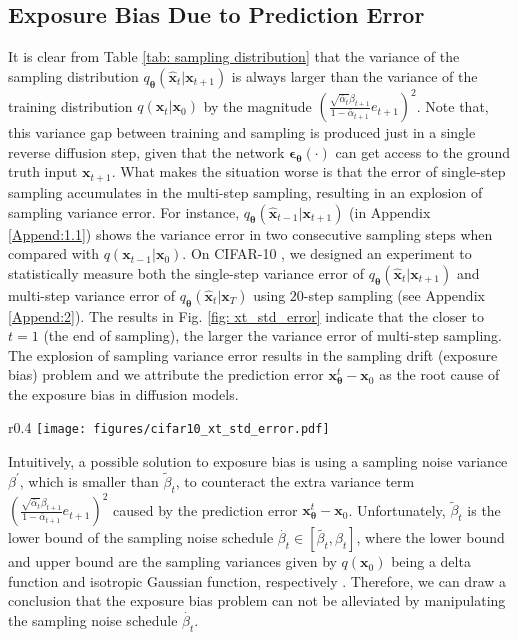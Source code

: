 \documentclass{article} \usepackage{iclr2024_conference,times}
\begin{document}
\subsection{Exposure Bias Due to Prediction Error}
\label{subsec: Exposure Bias Due to Prediction Error}

It is clear from Table \ref{tab: sampling distribution} that the variance of the sampling distribution $q_{\pmb{\theta}}(\hat{\pmb{x}}_{t} | \pmb{x}_{t+1})$ is always larger than the variance of the training distribution $q(\pmb{x}_{t} | \pmb{x}_0)$ by the magnitude $(\frac{\sqrt{\bar{\alpha}_t} \beta_{t+1}}{1-\bar{\alpha}_{t+1}} e_{t+1})^2$. Note that, this variance gap between training and sampling is produced just in a single reverse diffusion step, given that the network $\pmb{\epsilon_{\theta}}(\cdot)$ can get access to the ground truth input $\pmb{x}_{t+1}$. What makes the situation worse is that the error of single-step sampling accumulates in the multi-step sampling, resulting in an explosion of sampling variance error. For instance, $q_{\pmb{\theta}}(\hat{\pmb{x}}_{t-1} | \pmb{x}_{t+1})$ (in Appendix \ref{Append:1.1}) shows the variance error in two consecutive sampling steps when compared with $q(\pmb{x}_{t-1} | \pmb{x}_0)$. On CIFAR-10 \citep{cifar10}, we designed an experiment to statistically measure both the single-step variance error of $q_{\pmb{\theta}}(\hat{\pmb{x}}_{t} | \pmb{x}_{t+1})$ and multi-step variance error of $q_{\pmb{\theta}}(\hat{\pmb{x}}_{t} | \pmb{x}_{T})$ using $20$-step sampling (see Appendix \ref{Append:2}). The results in Fig. \ref{fig: xt_std_error} indicate that the closer to $t=1$ (the end of sampling), the larger the variance error of multi-step sampling. The explosion of sampling variance error results in the sampling drift (exposure bias) problem and we attribute the prediction error $\pmb{x}^{t}_{\pmb{\theta}} - \pmb{x}_0$ as the root cause of the exposure bias in diffusion models.

\begin{wrapfigure}{r}{0.4\textwidth}
\vskip -0.2in
  \texttt{[image: figures/cifar10\_xt\_std\_error.pdf]}
  \captionsetup{skip=2pt}
  \caption{Variance error in single-step and multi-step samplings.}
  \label{fig: xt_std_error}
\vskip -0.3in
\end{wrapfigure}


Intuitively, a possible solution to exposure bias is using a sampling noise variance $\beta^{'}$, which is smaller than $\tilde{\beta}_{t}$, to counteract the extra variance term $(\frac{\sqrt{\bar{\alpha}_t} \beta_{t+1}}{1-\bar{\alpha}_{t+1}} e_{t+1})^2$ caused by the prediction error $\pmb{x}^{t}_{\pmb{\theta}} - \pmb{x}_0$. Unfortunately, $\tilde{\beta}_{t}$ is the lower bound of the sampling noise schedule $ \dot{\beta_t} \in [\tilde{\beta_t}, \beta_t]$, where the lower bound and upper bound are the sampling variances given by $q(\pmb{x}_0)$ being a delta function and isotropic Gaussian function, respectively \citep{IDDPM}. Therefore, we can draw a conclusion that the exposure bias problem can not be alleviated by manipulating the sampling noise schedule $\dot{\beta_t}$.
\end{document}
